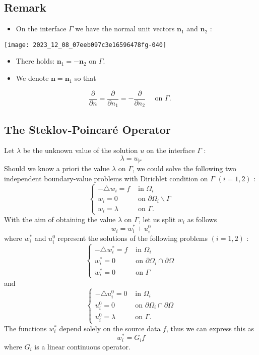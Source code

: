 \documentclass[11pt]{book}
\begin{document}
\subsection*{Remark}
\begin{itemize}
  \item On the interface $\Gamma$ we have the normal unit vectors $\mathbf{n}_{1}$ and $\mathbf{n}_{2}$ :
\end{itemize}
\begin{center}
\texttt{[image: 2023\_12\_08\_07eeb097c3e16596478fg-040]}
\end{center}
\begin{itemize}
  \item There holds: $\mathbf{n}_{1}=-\mathbf{n}_{2}$ on $\Gamma$.
  \item We denote $\mathbf{n}=\mathbf{n}_{1}$ so that
\end{itemize}
$$
\frac{\partial}{\partial n}=\frac{\partial}{\partial n_{1}}=-\frac{\partial}{\partial n_{2}} \quad \text { on } \Gamma \text {. }
$$
\subsection*{The Steklov-Poincaré Operator}
Let $\lambda$ be the unknown value of the solution $u$ on the interface $\Gamma$ :
$$
\lambda=u_{\mid r}
$$
Should we know a priori the value $\lambda$ on $\Gamma$, we could solve the following two independent boundary-value problems with Dirichlet condition on $\Gamma$ $(i=1,2)$ :
$$
\begin{cases}-\triangle w_{i}=f & \text { in } \Omega_{i} \\ w_{i}=0 & \text { on } \partial \Omega_{i} \backslash \Gamma \\ w_{i}=\lambda & \text { on } \Gamma .\end{cases}
$$
With the aim of obtaining the value $\lambda$ on $\Gamma$, let us split $w_{i}$ as follows
$$
w_{i}=w_{i}^{*}+u_{i}^{0}
$$
where $w_{i}^{*}$ and $u_{i}^{0}$ represent the solutions of the following problems $(i=1,2)$ :
$$
\begin{cases}-\triangle w_{i}^{*}=f & \text { in } \Omega_{i} \\ w_{i}^{*}=0 & \text { on } \partial \Omega_{i} \cap \partial \Omega \\ w_{i}^{*}=0 & \text { on } \Gamma\end{cases}
$$
and
$$
\begin{cases}-\triangle u_{i}^{0}=0 & \text { in } \Omega_{i} \\ u_{i}^{0}=0 & \text { on } \partial \Omega_{i} \cap \partial \Omega \\ u_{i}^{0}=\lambda & \text { on } \Gamma .\end{cases}
$$
The functions \( w_{i}^{*} \) depend solely on the source data \( f \), thus we can express this as
\[ w_{i}^{*} = G_{i} f \]
where \( G_{i} \) is a linear continuous operator.
\end{document}
